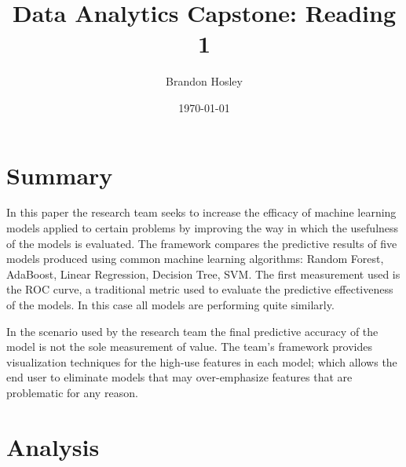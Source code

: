 \documentclass[]{article}
\title{Data Analytics Capstone: Reading 1}
\author{Brandon Hosley}
\date{\today}
\begin{document}
	\maketitle
	
\section{Summary} 

In this paper \cite{Lakkaraju2015} the research team seeks to increase the efficacy of machine learning models applied to certain problems by improving the way in which the usefulness of the models is evaluated. 
The framework compares the predictive results of five models produced using common machine learning algorithms: Random Forest, AdaBoost, Linear Regression, Decision Tree, SVM.
The first measurement used is the ROC curve, a traditional metric used to evaluate the predictive effectiveness of the models.
In this case all models are performing quite similarly.

In the scenario used by the research team the final predictive accuracy of the model is not the sole measurement of value.
The team's framework provides visualization techniques for the high-use features in each model;
which allows the end user to eliminate models that may over-emphasize features that are problematic for any reason.


\section{Analysis}




\clearpage


\end{document}
